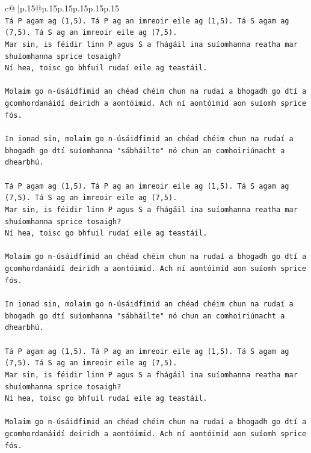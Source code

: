\documentclass{article}
\begin{document}
{\begin{supertabular}{c@{$\;$}|p{.15\linewidth}@{}p{.15\linewidth}p{.15\linewidth}p{.15\linewidth}p{.15\linewidth}p{.15\linewidth}}
{{{\\ 
\texttt{Tá P agam ag (1,5). Tá P ag an imreoir eile ag (1,5). Tá S agam ag (7,5). Tá S ag an imreoir eile ag (7,5).} \\
\texttt{Mar sin, is féidir linn P agus S a fhágáil ina suíomhanna reatha mar shuíomhanna sprice tosaigh?} \\
\texttt{Ní hea, toisc go bhfuil rudaí eile ag teastáil.} \\
\\ 
\texttt{Molaim go n{-}úsáidfimid an chéad chéim chun na rudaí a bhogadh go dtí a gcomhordanáidí deiridh a aontóimid. Ach ní aontóimid aon suíomh sprice fós.} \\
\\ 
\texttt{In ionad sin, molaim go n{-}úsáidfimid an chéad chéim chun na rudaí a bhogadh go dtí suíomhanna "sábháilte" nó chun an comhoiriúnacht a dhearbhú.} \\
\\ 
\texttt{Tá P agam ag (1,5). Tá P ag an imreoir eile ag (1,5). Tá S agam ag (7,5). Tá S ag an imreoir eile ag (7,5).} \\
\texttt{Mar sin, is féidir linn P agus S a fhágáil ina suíomhanna reatha mar shuíomhanna sprice tosaigh?} \\
\texttt{Ní hea, toisc go bhfuil rudaí eile ag teastáil.} \\
\\ 
\texttt{Molaim go n{-}úsáidfimid an chéad chéim chun na rudaí a bhogadh go dtí a gcomhordanáidí deiridh a aontóimid. Ach ní aontóimid aon suíomh sprice fós.} \\
\\ 
\texttt{In ionad sin, molaim go n{-}úsáidfimid an chéad chéim chun na rudaí a bhogadh go dtí suíomhanna "sábháilte" nó chun an comhoiriúnacht a dhearbhú.} \\
\\ 
\texttt{Tá P agam ag (1,5). Tá P ag an imreoir eile ag (1,5). Tá S agam ag (7,5). Tá S ag an imreoir eile ag (7,5).} \\
\texttt{Mar sin, is féidir linn P agus S a fhágáil ina suíomhanna reatha mar shuíomhanna sprice tosaigh?} \\
\texttt{Ní hea, toisc go bhfuil rudaí eile ag teastáil.} \\
\\ 
\texttt{Molaim go n{-}úsáidfimid an chéad chéim chun na rudaí a bhogadh go dtí a gcomhordanáidí deiridh a aontóimid. Ach ní aontóimid aon suíomh sprice fós.} \\
\\ 
}}}
\end{supertabular}}
\end{document}
